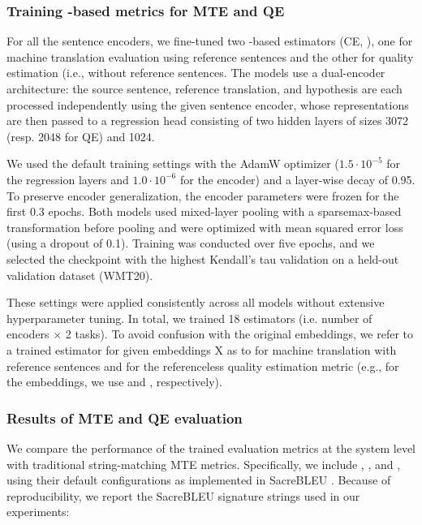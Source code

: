 \subsubsection{Training \comet-based metrics for MTE and QE}

For all the sentence encoders, we fine-tuned two \comet-based estimators (CE, \citealp{rei-etal-2020-comet}), one for machine translation evaluation using reference sentences and the other for quality estimation (i.e., without reference sentences. The \comet models use a dual-encoder architecture: the source sentence, reference translation, and hypothesis are each processed independently using the given sentence encoder, whose representations are then passed to a regression head consisting of two hidden layers of sizes 3072 (resp. 2048 for QE) and 1024.

We used the default training settings with the AdamW optimizer ($1.5 \cdot 10^{-5}$ for the regression layers and $1.0 \cdot 10^{-6}$ for the encoder) and a layer-wise decay of 0.95. To preserve encoder generalization, the encoder parameters were frozen for the first 0.3 epochs. Both models used mixed-layer pooling with a sparsemax-based transformation before pooling and were optimized with mean squared error loss (using a dropout of 0.1). Training was conducted over five epochs, and we selected the checkpoint with the highest Kendall's tau validation on a held-out validation dataset (WMT20).

These settings were applied consistently across all models without extensive hyperparameter tuning. In total, we trained 18 \comet estimators (i.e. number of encoders $\times$ 2 tasks). To avoid confusion with the original embeddings, we refer to a trained \comet estimator for given embeddings X as to  for machine translation with reference sentences and  for the referenceless quality estimation metric (e.g., for the \czert embeddings, we use \cometm{\czert} and \cometq{\czert}, respectively).

\subsubsection{Results of MTE and QE evaluation}

We compare the performance of the trained evaluation metrics at the system level with traditional string-matching MTE metrics. Specifically, we include \bleu \citep{papineni-etal-2002-bleu}, \ter \citep{snover-etal-2006-study}, and \chrf \citep{popovic-2015-chrf}, using their default configurations as implemented in SacreBLEU \citep{post-2018-call}.  Because of reproducibility, we report the SacreBLEU signature strings used in our experiments: 

